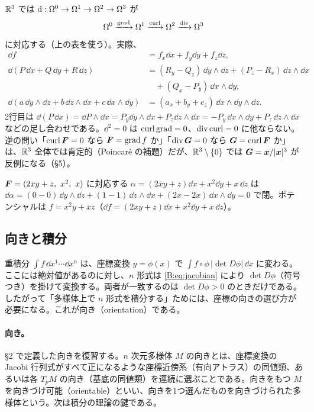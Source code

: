 $\mathbb R^3$ では $\mathrm{d}:\Omega^0\to\Omega^1\to\Omega^2\to\Omega^3$ が
\[
\Omega^0\xrightarrow{\operatorname{grad}}\Omega^1\xrightarrow{\operatorname{curl}}\Omega^2\xrightarrow{\operatorname{div}}\Omega^3
\]
に対応する（上の表を使う）。実際、
\begin{align*}
\dd f&=f_x\dd x+f_y\dd y+f_z\dd z,\\
\dd(P\,\dd x+Q\,\dd y+R\,\dd z)&=(R_y-Q_z)\,\dd y\wedge\dd z+(P_z-R_x)\,\dd z\wedge\dd x\\
&\quad+(Q_x-P_y)\,\dd x\wedge\dd y,\\
\dd(a\,\dd y\wedge\dd z+b\,\dd z\wedge\dd x+c\,\dd x\wedge\dd y)&=(a_x+b_y+c_z)\,\dd x\wedge\dd y\wedge\dd z .
\end{align*}
2行目は $\dd(P\,\dd x)=\dd P\wedge\dd x=P_y\dd y\wedge\dd x+P_z\dd z\wedge\dd x=-P_y\,\dd x\wedge\dd y+P_z\,\dd z\wedge\dd x$ などの足し合わせである。$\dd^2=0$ は $\operatorname{curl}\operatorname{grad}=0$、$\operatorname{div}\operatorname{curl}=0$ に他ならない。逆の問い「$\operatorname{curl}\boldsymbol F=0$ なら $\boldsymbol F=\operatorname{grad} f$ か」「$\operatorname{div}\boldsymbol G=0$ なら $\boldsymbol G=\operatorname{curl}\boldsymbol F$ か」は、$\mathbb R^3$ 全体では肯定的（Poincaré の補題）だが、$\mathbb R^3\setminus\{0\}$ では $\boldsymbol G=\boldsymbol x/|\boldsymbol x|^3$ が反例になる（§5）。

\begin{ex}[勾配場とポテンシャル]
$\boldsymbol F=(2xy+z,\ x^2,\ x)$ に対応する $\alpha=(2xy+z)\dd x+x^2\dd y+x\,\dd z$ は $\dd\alpha=(0-0)\,\dd y\wedge\dd z+(1-1)\,\dd z\wedge\dd x+(2x-2x)\,\dd x\wedge\dd y=0$ で閉。ポテンシャルは $f=x^2y+xz$（$\dd f=(2xy+z)\dd x+x^2\dd y+x\,\dd z$）。
\end{ex}

\subsection{向きと積分}\label{B:ss:int}

重積分 $\int f\,\dd x^1\cdots\dd x^n$ は、座標変換 $y=\phi(x)$ で $\int f\circ\phi\,|\det D\phi|\,\dd x$ に変わる。ここには絶対値があるのに対し、$n$ 形式は \eqref{B:eq:jacobian} により $\det D\phi$（符号つき）を掛けて変換する。両者が一致するのは $\det D\phi>0$ のときだけである。したがって「多様体上で $n$ 形式を積分する」ためには、座標の向きの選び方が必要になる。これが向き（orientation）である。

\paragraph{向き。}§2 で定義した向きを復習する。$n$ 次元多様体 $M$ の向きとは、座標変換の Jacobi 行列式がすべて正になるような座標近傍系（有向アトラス）の同値類、あるいは各 $T_pM$ の向き（基底の同値類）を連続に選ぶことである。向きをもつ $M$ を向きづけ可能（orientable）といい、向きを1つ選んだものを向きづけられた多様体という。次は積分の理論の鍵である。

